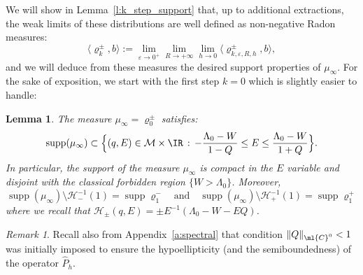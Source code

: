 \documentclass[JEP,XML,SOM,Unicode, NoEqCountersInSection,published]{cedram}
\theoremstyle{plain}
\newtheorem{lemm}[theo]{Lemma}
\theoremstyle{definition}
\theoremstyle{remark}
\newtheorem{rema}[theo]{Remark}
\begin{document}
We will show in Lemma~\ref{l:k_step_support} that, up to additional extractions, the weak limits of these distributions are well defined as non-negative Radon measures:
\[
\langle \varrho_{k}^\pm , b \rangle := \lim_{\varepsilon\to 0^+}\lim_{R \to + \infty} \lim_{h \to 0} \langle \varrho^\pm_{k,\varepsilon,R,h} , b \rangle,
\]
and we will deduce from these measures the desired support properties of $\mu_\infty$. For the sake of exposition, we start with the first step $k = 0$ which is slightly easier to handle:

\begin{lemm}
\label{l:0_step_support} The measure $\mu_\infty= \varrho_{0}^{\pm}$ satisfies:
\[
\operatorname{supp}(\mu_\infty)\subset\Bigl\{ (q,E) \in \mathcal{M} \times \IR \, : \, -\frac{\Lambda_0-W}{1-Q}\leq E \leq \frac{\Lambda_0-W}{1+Q}\Bigr\}.
\]
In particular, the support of the measure $\mu_\infty$ is compact in the $E$ variable and disjoint with the classical forbidden region $\{W>\Lambda_0\}$. Moreover,
\begin{equation}
\operatorname{supp}(\mu_\infty) \setminus \mathcal{H}_-^{-1}(1) = \operatorname{supp} \varrho^-_{1} \quad \text{and}\quad \operatorname{supp}(\mu_\infty) \setminus \mathcal{H}_+^{-1}(1) = \operatorname{supp} \varrho^+_{1}
\end{equation}
where we recall that $\mathcal{H}_{\pm}(q,E) = \pm E^{-1}(\Lambda_0 - W - E Q)$.
\end{lemm}

\begin{rema}
Recall also from Appendix~\ref{a:spectral} that condition $\|Q\|_{\ml{C}^0}<1$ was initially imposed to ensure the hypoellipticity (and the semiboundedness) of the operator $\widehat{P}_h$.
\end{rema}
\end{document}
